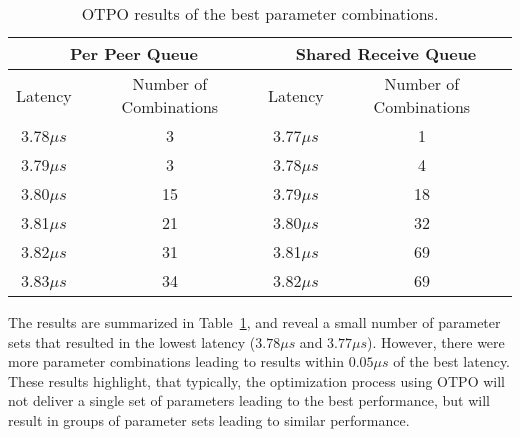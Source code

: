 \begin{table}[tb]
\centering
\caption{OTPO results of the best parameter combinations.}
\label{table:results} 
\begin{tabular}{|c|c||c|c|} 
\hline
\multicolumn{2}{|c|}{Per Peer Queue} & \multicolumn{2}{|c|}{Shared Receive Queue} \\
\hline
Latency & Number of Combinations & Latency & Number of Combinations\\
\hline
3.78$\mu s$  & 3& 3.77$\mu s$  & 1\\ 
\hline		  
3.79$\mu s$  & 3 & 3.78$\mu s$  & 4\\ 
\hline		  
3.80$\mu s$  & 15 & 3.79$\mu s$  & 18\\
\hline
3.81$\mu s$  & 21 & 3.80$\mu s$  & 32\\
\hline		  
3.82$\mu s$  & 31 &3.81$\mu s$  & 69\\
\hline		   
3.83$\mu s$  & 34 & 3.82$\mu s$  & 69\\
\hline
\end{tabular}  
\end{table}


The results are summarized in Table~\ref{table:results}, and reveal a small number of parameter sets that resulted in the lowest latency ($3.78\mu s$ and $3.77\mu s$). However, there were more parameter combinations leading to results within $0.05\mu s$ of the best latency.  These results highlight, that typically, the optimization process using OTPO will not deliver a single set of parameters leading to the best performance, but will result in groups of parameter sets leading to similar performance. %

